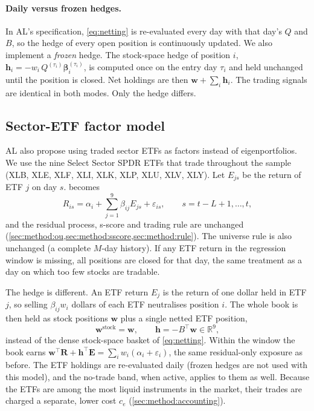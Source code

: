 \paragraph{Daily versus frozen hedges.}
In AL's specification, \cref{eq:netting} is re-evaluated every day with that day's $Q$ and $B$,
so the hedge of every open position is continuously updated. We also implement a
\emph{frozen} hedge. The stock-space hedge of position $i$,
$\bm h_i = -w_i\, Q^{(\tau_i)} \bm\beta_i^{(\tau_i)}$, is computed once on the entry day
$\tau_i$ and held unchanged until the position is closed. Net holdings are then
$\bm w + \sum_i \bm h_i$. The trading signals are identical in both modes. Only the hedge
differs.

\subsection{Sector-ETF factor model}
\label{sec:method:etf}

AL also propose using traded sector ETFs as factors instead of eigenportfolios. We use the nine
Select Sector SPDR ETFs that trade throughout the sample (XLB, XLE, XLF, XLI, XLK, XLP, XLU, XLV,
XLY). Let $E_{js}$ be the return of ETF $j$ on day $s$.  becomes
\begin{equation}
  R_{is} = \alpha_i + \sum_{j=1}^{9} \beta_{ij} E_{js} + \varepsilon_{is},
  \qquad s = t-L+1,\dots,t ,
  \label{eq:etf-regression}
\end{equation}
and the residual process, s-score and trading rule are unchanged
(\cref{sec:method:ou,sec:method:sscore,sec:method:rule}). The universe rule is also unchanged (a
complete $M$-day history). If any ETF return in the regression window is missing, all positions are
closed for that day, the same treatment as a day on which too few stocks are tradable.

The hedge is different. An ETF return $E_j$ is the return of one dollar held in ETF $j$, so
selling $\beta_{ij} w_i$ dollars of each ETF neutralises position $i$. The whole book is then held
as stock positions $\bm w$ plus a single netted ETF position,
\begin{equation}
  \bm w^{\text{stock}} = \bm w, \qquad \bm h = -B^\top \bm w \in \mathbb R^{9},
  \label{eq:etf-hedge}
\end{equation}
instead of the dense stock-space basket of \cref{eq:netting}. Within the window the book earns
$\bm w^\top \bm R + \bm h^\top \bm E = \sum_i w_i(\alpha_i + \varepsilon_i)$, the same
residual-only exposure as before. The ETF holdings are re-evaluated daily (frozen hedges are not
used with this model), and the no-trade band, when active, applies to them as well. Because the
ETFs are among the most liquid instruments in the market, their trades are charged a separate,
lower cost $c_e$ (\cref{sec:method:accounting}).

